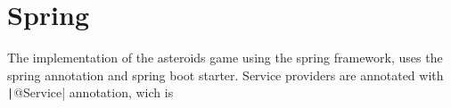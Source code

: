 \section{Spring}
The implementation of the asteroids game using the spring framework,
uses the spring annotation and spring boot starter.
Service providers are annotated with \texttt|@Service| annotation,
wich is 
